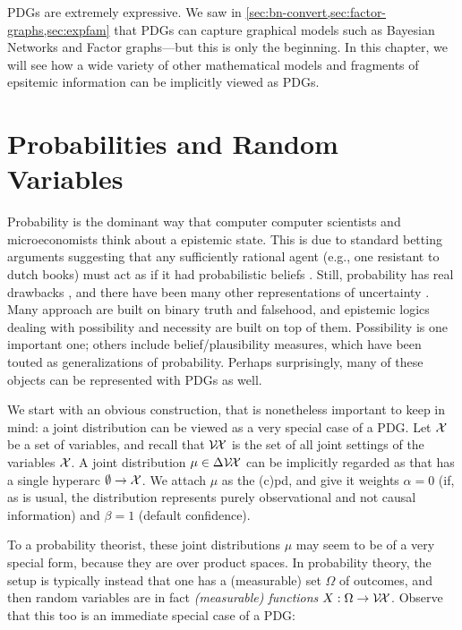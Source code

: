 
PDGs are extremely expressive.
We saw in \cref{sec:bn-convert,sec:factor-graphs,sec:expfam} that PDGs
can capture graphical models such as Bayesian Networks and Factor graphs---but this is only the beginning. 
%
In this chapter, we will see how a wide variety of other mathematical models and fragments of epsitemic information can be implicitly viewed as PDGs.


\section{Probabilities and Random Variables}

Probability is the dominant way that computer computer scientists and
microeconomists think about a epistemic state.
This is due to standard betting arguments suggesting that any sufficiently rational agent (e.g., one resistant to dutch books)
must act as if it had probabilistic beliefs \cite{..,savage}.
Still, probability has real drawbacks \cite{}, and there have been many other representations of uncertainty \cite{halpern2017reasoning}.
Many approach are built on binary truth and falsehood, and epistemic logics dealing with possibility and necessity are built on top of them.
Possibility is one important one; others include belief/plausibility measures, which have been touted as generalizations of probability. 
Perhaps surprisingly, many of these objects can be represented with PDGs as well.

We start with an obvious construction, that is nonetheless important
to keep in mind: a joint distribution can be viewed as a very special case of a PDG. 
Let $\mathcal X$ be a set of variables, and recall that $\mathcal V\!\mathcal X$ is the set of all joint settings of the variables $\mathcal X$. 
A joint distribution $\mu \in \Delta \mathcal V\!\mathcal X$ can be implicitly regarded as that has a single hyperarc $\emptyset \to \mathcal X$. We attach $\mu$ as the (c)pd, and give it weights $\alpha=0$ (if, as is usual, the distribution represents purely observational and not causal information) and $\beta = 1$ (default confidence). 

To a probability theorist, these joint distributions $\mu$ may seem to be of a very special form, because they are over product spaces. 
In probability theory, the setup is typically instead that one has a (measurable) set $\Omega$ of outcomes, and then random variables are in fact \emph{(measurable) functions} $X : \Omega \to \mathcal V\!\mathcal X$. 
Observe that this too is an immediate special case of a PDG:

